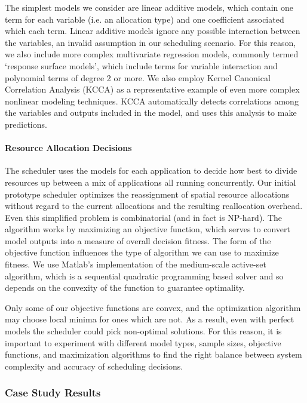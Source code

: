 The simplest models we consider are linear additive models, which
contain one term for each variable (i.e. an allocation type) and one
coefficient associated which each term.  Linear additive models
ignore any possible interaction between the variables, an invalid
assumption in our scheduling scenario.  For this reason, we also
include more complex multivariate regression models, commonly termed
`response surface models', which include terms for variable
interaction and polynomial terms of degree 2 or more.  We also employ
Kernel Canonical Correlation Analysis (KCCA) \cite{kcca} as a
representative example of even more complex nonlinear modeling
techniques. KCCA automatically detects correlations among the
variables and outputs included in the model, and uses this analysis
to make predictions.


\paragraph{Resource Allocation Decisions}

The scheduler uses the models for each application to decide how best
to divide resources up between a mix of applications all running
concurrently.  Our initial prototype scheduler optimizes the
reassignment of spatial resource allocations without regard to the
current allocations and the resulting reallocation overhead.  Even
this simplified problem is combinatorial (and in fact is
NP-hard). The algorithm works by maximizing an objective function,
which serves to convert model outputs into a measure of overall
decision fitness.  The form of the objective function influences the
type of algorithm we can use to maximize fitness. We use Matlab's
\cite{matlab} implementation of the medium-scale active-set
algorithm, which is a sequential quadratic programming based solver
and so depends on the convexity of the function to guarantee
optimality.

Only some of our objective functions are convex, and the optimization
algorithm may choose local minima for ones which are not.  As a
result, even with perfect models the scheduler could pick non-optimal
solutions.  For this reason, it is important to experiment with
different model types, sample sizes, objective functions, and
maximization algorithms to find the right balance between system
complexity and accuracy of scheduling decisions.




\subsubsection*{Case Study Results}

